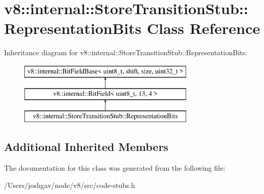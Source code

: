 \hypertarget{classv8_1_1internal_1_1_store_transition_stub_1_1_representation_bits}{}\section{v8\+:\+:internal\+:\+:Store\+Transition\+Stub\+:\+:Representation\+Bits Class Reference}
\label{classv8_1_1internal_1_1_store_transition_stub_1_1_representation_bits}
Inheritance diagram for v8\+:\+:internal\+:\+:Store\+Transition\+Stub\+:\+:Representation\+Bits\+:\begin{figure}[H]
\begin{center}
\leavevmode
\includegraphics[height=3.000000cm]{classv8_1_1internal_1_1_store_transition_stub_1_1_representation_bits}
\end{center}
\end{figure}
\subsection*{Additional Inherited Members}


The documentation for this class was generated from the following file\+:\begin{DoxyCompactItemize}
\item 
/\+Users/joshgav/node/v8/src/code-\/stubs.\+h\end{DoxyCompactItemize}
